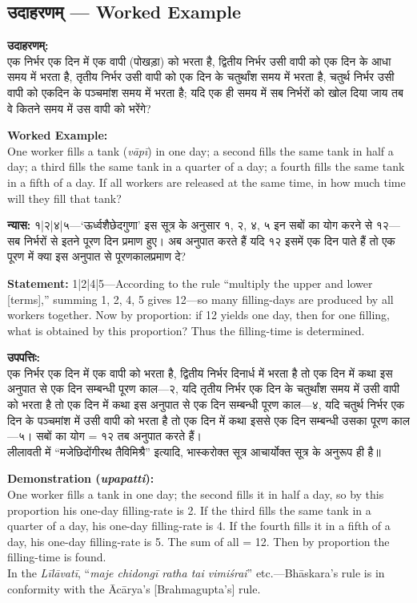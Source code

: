 \documentclass[10pt,a4paper]{article}
\newcommand{\dev}[1]{{\devanagarifont #1}}
\newcommand{\bilingual}[2]{%
  \noindent%
  \begin{minipage}[t]{0.47\textwidth}%
    \setstretch{1.15}#1%
  \end{minipage}%
  \hfill%
  \vrule\hfill%
  \begin{minipage}[t]{0.47\textwidth}%
    \setstretch{1.15}#2%
  \end{minipage}%
  \par\medskip
}
\begin{document}
\subsection{\dev{उदाहरणम्} --- Worked Example}

\bilingual{%
\textbf{उदाहरणम्:}\\[0.3em]
एक निर्भर एक दिन में एक वापी (पोखड़ा) को भरता है, द्वितीय निर्भर उसी वापी को एक दिन के आधा समय में भरता है, तृतीय निर्भर उसी वापी को एक दिन के चतुर्थांश समय में भरता है, चतुर्थ निर्भर उसी वापी को एकदिन के पञ्चमांश समय में भरता है; यदि एक ही समय में सब निर्भरों को खोल दिया जाय तब वे कितने समय में उस वापी को भरेंगे?
}{%
\textbf{Worked Example:}\\[0.3em]
One worker fills a tank (\textit{vāpī}) in one day; a second fills the same tank in half a day; a third fills the same tank in a quarter of a day; a fourth fills the same tank in a fifth of a day. If all workers are released at the same time, in how much time will they fill that tank?
}

\bilingual{%
\textbf{न्यास:} १|२|४|५---`ऊर्ध्वशैछेदगुणा' इस सूत्र के अनुसार १, २, ४, ५ इन सबों का योग करने से १२---सब निर्भरों से इतने पूरण दिन प्रमाण हुए। अब अनुपात करते हैं यदि १२ इसमें एक दिन पाते हैं तो एक पूरण में क्या इस अनुपात से पूरणकालप्रमाण दे?
}{%
\textbf{Statement:} 1|2|4|5---According to the rule ``multiply the upper and lower [terms],'' summing 1, 2, 4, 5 gives 12---so many filling-days are produced by all workers together. Now by proportion: if 12 yields one day, then for one filling, what is obtained by this proportion? Thus the filling-time is determined.
}

\bilingual{%
\textbf{उपपत्तिः:}\\[0.3em]
एक निर्भर एक दिन में एक वापी को भरता है, द्वितीय निर्भर दिनार्ध में भरता है तो एक दिन में कथा इस अनुपात से एक दिन सम्बन्धी पूरण काल---२, यदि तृतीय निर्भर एक दिन के चतुर्थांश समय में उसी वापी को भरता है तो एक दिन में कथा इस अनुपात से एक दिन सम्बन्धी पूरण काल---४, यदि चतुर्थ निर्भर एक दिन के पञ्चमांश में उसी वापी को भरता है तो एक दिन में कथा इससे एक दिन सम्बन्धी उसका पूरण काल---५। सबों का योग = १२ तब अनुपात करते हैं।\\[0.3em]
लीलावती में ``मजेछिदोंगीरथ तैविमिश्रै'' इत्यादि, भास्करोक्त सूत्र आचार्योक्त सूत्र के अनुरूप ही है॥
}{%
\textbf{Demonstration (\textit{upapatti}):}\\[0.3em]
One worker fills a tank in one day; the second fills it in half a day, so by this proportion his one-day filling-rate is 2. If the third fills the same tank in a quarter of a day, his one-day filling-rate is 4. If the fourth fills it in a fifth of a day, his one-day filling-rate is 5. The sum of all = 12. Then by proportion the filling-time is found.\\[0.3em]
In the \textit{Līlāvatī}, ``\textit{maje chidongī ratha tai vimiśrai}'' etc.---Bhāskara's rule is in conformity with the Ācārya's [Brahmagupta's] rule.
}
\end{document}
